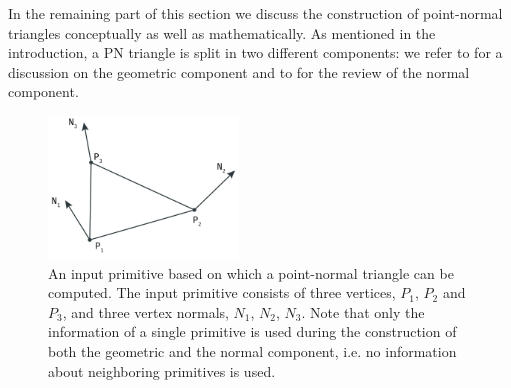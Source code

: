 In the remaining part of this section we discuss the construction of point-normal triangles conceptually as well as mathematically. As mentioned in the introduction, a PN triangle is split in two different components: we refer to  for a discussion on the geometric component and to  for the review of the normal component.

\begin{figure}
	\centering
	\includegraphics[width=0.45\textwidth]{./content/img/method/input.png}
	\caption{An input primitive based on which a point-normal triangle can be computed. The input primitive consists of three vertices, $P_1$, $P_2$ and $P_3$, and three vertex normals, $N_1$, $N_2$, $N_3$. Note that only the information of a single primitive is used during the construction of both the geometric and the normal component, i.e. no information about neighboring primitives is used.}
	\label{fig:method:input_primitive}
\end{figure}

% 

% 
